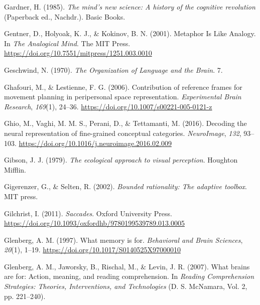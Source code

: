 \documentclass[
  a4paper,12pt,twoside,onecolumn,openright,final,oldfontcommands]{memoir}
\newlength{\cslhangindent}
\newlength{\cslentryspacingunit} %
\newenvironment{CSLReferences}[2] %
 {%
  \setlength{\parindent}{0pt}
  \ifodd #1
  \let\oldpar\par
  \def\par{\hangindent=\cslhangindent\oldpar}
  \fi
  \setlength{\parskip}{#2\cslentryspacingunit}
 }%
 {}
\begin{document}
\begin{CSLReferences}{1}{0}
\leavevmode{}%
Gardner, H. (1985). \emph{The mind's new science: A history of the cognitive revolution} (Paperback ed., Nachdr.). Basic Books.

\leavevmode{}%
Gentner, D., Holyoak, K. J., \& Kokinov, B. N. (2001). Metaphor {Is} {Like} {Analogy}. In \emph{The {Analogical} {Mind}}. The MIT Press. \url{https://doi.org/10.7551/mitpress/1251.003.0010}

\leavevmode{}%
Geschwind, N. (1970). \emph{The {Organization} of {Language} and the {Brain}}. 7.

\leavevmode{}%
Ghafouri, M., \& Lestienne, F. G. (2006). Contribution of reference frames for movement planning in peripersonal space representation. \emph{Experimental Brain Research}, \emph{169}(1), 24--36. \url{https://doi.org/10.1007/s00221-005-0121-z}

\leavevmode{}%
Ghio, M., Vaghi, M. M. S., Perani, D., \& Tettamanti, M. (2016). Decoding the neural representation of fine-grained conceptual categories. \emph{NeuroImage}, \emph{132}, 93--103. \url{https://doi.org/10.1016/j.neuroimage.2016.02.009}

\leavevmode{}%
Gibson, J. J. (1979). \emph{The ecological approach to visual perception}. Houghton Mifflin.

\leavevmode{}%
Gigerenzer, G., \& Selten, R. (2002). \emph{Bounded rationality: {The} adaptive toolbox}. MIT press.

\leavevmode{}%
Gilchrist, I. (2011). \emph{Saccades}. Oxford University Press. \url{https://doi.org/10.1093/oxfordhb/9780199539789.013.0005}

\leavevmode{}%
Glenberg, A. M. (1997). What memory is for. \emph{Behavioral and Brain Sciences}, \emph{20}(1), 1--19. \url{https://doi.org/10.1017/S0140525X97000010}

\leavevmode{}%
Glenberg, A. M., Jaworsky, B., Rischal, M., \& Levin, J. R. (2007). What brains are for: Action, meaning, and reading comprehension. In \emph{Reading {Comprehension} {Strategies}: {Theories}, {Interventions}, and {Technologies}} (D. S. McNamara, Vol. 2, pp. 221--240).


\end{CSLReferences}
\end{document}
